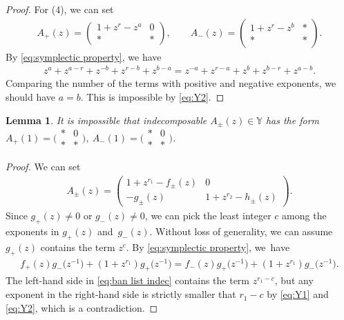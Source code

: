 \documentclass[pdftex]{sigma}
\numberwithin{equation}{section}
\newtheorem{Lemma}[Theorem]{Lemma}
\theoremstyle{definition}
\begin{document}
\begin{proof}
 For (4), we can set
 \begin{align*}
 A_+(z) =
 \begin{pmatrix}
 1 + z^r -z^a & 0 \\
 * & *
 \end{pmatrix},\qquad
 A_-(z) =
 \begin{pmatrix}
 1 + z^r - z^b & * \\
 * & *
 \end{pmatrix}.
 \end{align*}
 By \eqref{eq:symplectic property}, we have
 \begin{align*}
 z^{a} + z^{a-r} + z^{-b} + z^{r-b} + z^{b-a} =
 z^{-a} + z^{r-a} + z^{b} + z^{b-r} + z^{a-b}.
 \end{align*}
 Comparing the number of the terms with positive and negative exponents,
 we should have $a = b$. This is impossible by \eqref{eq:Y2}.
\end{proof}

\begin{Lemma}\label{lemma:ban list indec}
 It is impossible that indecomposable $A_\pm(z) \in \mathbb{Y}$ has the form
$
 A_+(1) =
 \bigl(\begin{smallmatrix}
 * & 0 \\
 * & *
\end{smallmatrix}\bigr)$, $
 A_-(1) =
 \bigl(\begin{smallmatrix}
 * & 0 \\
 * & *
\end{smallmatrix}\bigr)$.

\end{Lemma}
\begin{proof}
 We can set
 \begin{align*}
 A_\pm(z) =
 \begin{pmatrix}
 1 + z^{r_1} - f_\pm(z) & 0 \\
 -g_\pm(z) & 1+z^{r_2} -h_\pm(z)
 \end{pmatrix}.
 \end{align*}
 Since $g_+(z)\neq 0$ or $g_-(z)\neq 0$,
 we can pick the least integer $c$ among the exponents in $g_+(z)$ and~$g_-(z)$.
 Without loss of generality, we can assume $g_+(z)$ contains the term $z^c$.
 By \eqref{eq:symplectic property}, we~have
 \begin{align}\label{eq:ban list indec}
 f_+(z) g_-\bigl(z^{-1}\bigr) + (1+z^{r_1}) g_+ \bigl(z^{-1}\bigr)=
 f_-(z) g_+\bigl(z^{-1}\bigr) + (1+z^{r_1}) g_- \bigl(z^{-1}\bigr).
 \end{align}
 The left-hand side in \eqref{eq:ban list indec} contains the term $z^{r_1 - c}$,
 but any exponent in the right-hand side is strictly smaller that $r_1 - c$ by
 \eqref{eq:Y1} and \eqref{eq:Y2}, which is a contradiction.
\end{proof}
\end{document}
